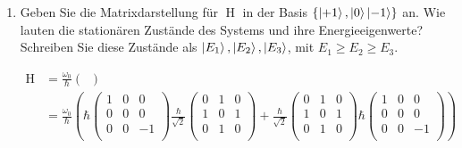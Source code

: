 \documentclass[11pt,a4paper]{scrartcl}
\begin{document}
    \begin{enumerate}
        \item Geben Sie die Matrixdarstellung für $\operatorname{H}$ in der Basis $\{\ket{+1}, \ket{0}\ket{-1}\}$ an. Wie lauten die stationären Zustände des Systems und ihre Energieeigenwerte? Schreiben Sie diese Zustände als $\ket{E_1}, \ket{E_2}, \ket{E_3}$, mit $E_1 \geq E_2 \geq E_3$.
        \begin{calculationbox}
            \begin{calculationbox}
                \begin{align*}
                    \operatorname{H}&=\frac{\omega_0}{\hbar} \left(
                        \operatorname{}
                    \right)
                    \\
                    &=
                    \frac{\omega_0}{\hbar} \left( 
                        \hbar
                        \begin{pmatrix}
                            1&0&0\\
                            0&0&0\\
                            0&0&-1\\
                        \end{pmatrix}
                        \frac{\hbar}{\sqrt{2}}
                        \begin{pmatrix}
                            0&1&0\\
                            1&0&1\\
                            0&1&0\\
                        \end{pmatrix}
                        + \frac{\hbar}{\sqrt{2}}
                        \begin{pmatrix}
                            0&1&0\\
                            1&0&1\\
                            0&1&0\\
                        \end{pmatrix}
                        \hbar
                        \begin{pmatrix}
                            1&0&0\\
                            0&0&0\\
                            0&0&-1\\
                        \end{pmatrix}
                    \right)\\

\end{align*}
\end{calculationbox}
\end{calculationbox}
\end{enumerate}
\end{document}
